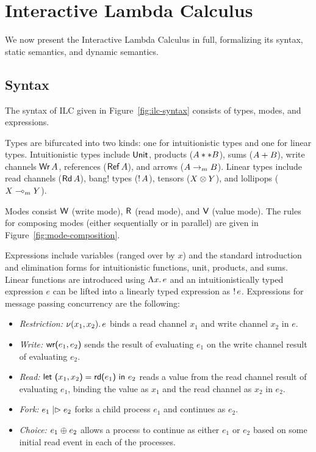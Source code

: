 \section{Interactive Lambda Calculus}
\label{sec:ilc}

We now present the Interactive Lambda Calculus in full, formalizing its syntax,
static semantics, and dynamic semantics.

\subsection{Syntax}
\label{subsec:syntax}



The syntax of ILC given in Figure~\ref{fig:ilc-syntax} consists of types, modes,
and expressions.

Types are bifurcated into two kinds: one for intuitionistic types and one for
linear types. Intuitionistic types include $\text{\textsf{Unit}}$, products
(${A} ** {B}$), sums (${A} + {B}$), write channels $\text{\textsf{Wr}}\,A$, references
($\text{\textsf{Ref}}\,A$), and arrows (${A}\rightarrow_{\footnotesize m}{B}$). Linear types
include read channels ($\text{\textsf{Rd}}\,A$), bang! types (${!}\,{A}$), tensors
(${X}\otimes{Y}$), and lollipops (${X}\multimap_{\footnotesize m}{Y}$).

Modes consist $\textsf{W}$ (write mode), $\textsf{R}$ (read mode), and $\textsf{V}$ (value mode). The
rules for composing modes (either sequentially or in parallel) are given in
Figure~\ref{fig:mode-composition}.

Expressions include variables (ranged over by $x$) and the standard introduction
and elimination forms for intuitionistic functions, unit, products, and
sums.  Linear functions are introduced using
$\Lambda{x}.\,{e}$ and an intuitionistically typed expression $e$ can be lifted into
a linearly typed expression as ${!}\,{e}$. 
Expressions for message passing concurrency are the following:
\begin{itemize}[leftmargin=*]
  \item \emph{Restriction:} $\nu(x_1, x_2).\,e$ binds a read channel $x_1$ and
    write channel $x_2$ in $e$.
  \item \emph{Write:} $\text{\textsf{wr}}\textsf{(}{e_1},{e_2}\textsf{)}$ sends the result of evaluating $e_1$ on
    the write channel result of evaluating $e_2$.
  \item \emph{Read:} $\text{\textsf{let}}\ {\textsf{(}{x_1},{x_2}\textsf{)}} = {\text{\textsf{rd}}\textsf{(}{e_1}\textsf{)}}\ \text{\textsf{in}}\ {{e_2}}$ reads a value from the read
    channel result of evaluating $e_1$, binding the value as $x_1$ and the read
    channel as $x_2$ in $e_2$.
  \item \emph{Fork:} $e_1 \mathrel{|\rhd} e_2$ forks a child process $e_1$ and
    continues as $e_2$.
  \item \emph{Choice:} $e_1 \mathrel{\oplus} e_2$ allows a process to continue as
    either $e_1$ or $e_2$ based on some initial read event in each of the
    processes.
\end{itemize}

